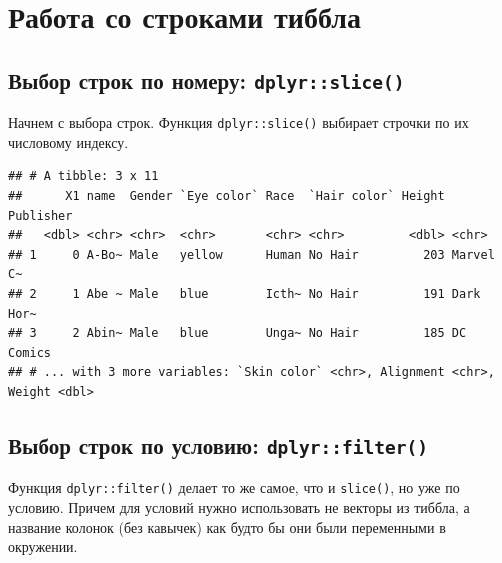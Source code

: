 \documentclass[
]{book}
\newenvironment{Shaded}{\begin{snugshade}}{\end{snugshade}}
\newcommand{\DecValTok}[1]{\textcolor[rgb]{0.00,0.00,0.81}{#1}}
\newcommand{\KeywordTok}[1]{\textcolor[rgb]{0.13,0.29,0.53}{\textbf{#1}}}
\newcommand{\NormalTok}[1]{#1}
\newcommand{\OperatorTok}[1]{\textcolor[rgb]{0.81,0.36,0.00}{\textbf{#1}}}
\newcommand{\StringTok}[1]{\textcolor[rgb]{0.31,0.60,0.02}{#1}}
\begin{document}
\hypertarget{tidy_select_rows}{%
\section{Работа со строками тиббла}\label{tidy_select_rows}}

\hypertarget{tidy_slice}{%
\subsection{\texorpdfstring{Выбор строк по номеру: \texttt{dplyr::slice()}}{Выбор строк по номеру: dplyr::slice()}}\label{tidy_slice}}

Начнем с выбора строк. Функция \texttt{dplyr::slice()} выбирает строчки по их числовому индексу.

\begin{Shaded}
\end{Shaded}

\begin{verbatim}
## # A tibble: 3 x 11
##      X1 name  Gender `Eye color` Race  `Hair color` Height Publisher
##   <dbl> <chr> <chr>  <chr>       <chr> <chr>         <dbl> <chr>    
## 1     0 A-Bo~ Male   yellow      Human No Hair         203 Marvel C~
## 2     1 Abe ~ Male   blue        Icth~ No Hair         191 Dark Hor~
## 3     2 Abin~ Male   blue        Unga~ No Hair         185 DC Comics
## # ... with 3 more variables: `Skin color` <chr>, Alignment <chr>, Weight <dbl>
\end{verbatim}

\hypertarget{tidy_filter}{%
\subsection{\texorpdfstring{Выбор строк по условию: \texttt{dplyr::filter()}}{Выбор строк по условию: dplyr::filter()}}\label{tidy_filter}}

Функция \texttt{dplyr::filter()} делает то же самое, что и \texttt{slice()}, но уже по условию. Причем для условий нужно использовать не векторы из тиббла, а название колонок (без кавычек) как будто бы они были переменными в окружении.

\begin{Shaded}
\end{Shaded}
\end{document}
